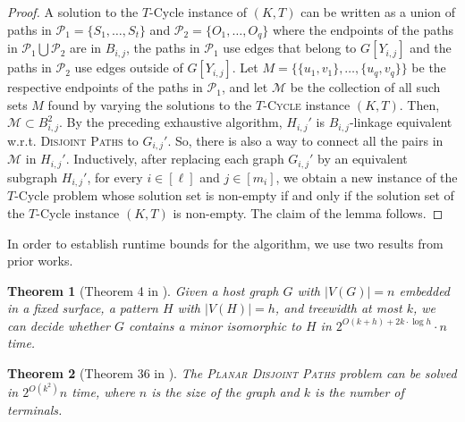 \documentclass{article}
\newtheorem{theorem}{Theorem}
\numberwithin{claimcounter}{lemma}
\newcommand{\tcycle}{$T$-\textsc{Cycle}\xspace}
\newcommand{\dispaths}{\textsc{Disjoint Paths}\xspace}
\begin{document}
\begin{proof}
    A solution to the {\sc $T$-Cycle} instance of $(K,T)$  can be written as a union  of paths in $\mathcal{P}_1 = \{S_1, \dots, S_t\}$ and $\mathcal{P}_2 = \{O_1, \dots, O_q\}$ where the endpoints of the paths in  $\mathcal{P}_1 \bigcup \mathcal{P}_2$ are in $B_{i,j}$,  the paths in $\mathcal{P}_1$ use edges that belong to $G[Y_{i,j}]$ and the paths in $\mathcal{P}_2$ use edges outside of $G[Y_{i,j}]$. Let $M = \{ \{u_1,v_1\},\dots,\{u_q,v_q\} \}$ be the respective endpoints of the paths in $\mathcal{P}_1$, and let $\mathcal{M}$ be the collection of all such sets $M$ found by varying the solutions to the \tcycle instance $(K,T)$. Then, $\mathcal{M} \subset B_{i,j}^2$. By the preceding exhaustive algorithm, $H_{i,j}'$ is $B_{i,j}$-linkage equivalent w.r.t. \dispaths to $G_{i,j}'$. So, there is also a way to connect all the pairs in $\mathcal{M}$ in $H_{i,j}'$.
Inductively, after replacing each graph $G_{i,j}'$ by an equivalent subgraph $H_{i,j}'$, for every $i\in [\ell]$ and $j \in [m_i]$, we obtain a new instance of the  {\sc $T$-Cycle} problem whose solution set is non-empty if and only if the solution set of the {\sc $T$-Cycle} instance $(K,T)$ is non-empty. The claim of the lemma follows.
\end{proof}

In order to establish runtime bounds for the algorithm, we  use two  results from prior works.

\begin{theorem}[Theorem 4 in \cite{adlertwo}] \label{thm:adlerres}
    Given a host graph $G$ with $|V(G)|=n$ embedded in a fixed surface,
a pattern $H$ with $|V(H)|=h$, and treewidth at most $k$, we can
decide whether $G$ contains a minor isomorphic to $H$ in $2^{O(k+h)+2k \cdot \log h} \cdot n$ time.
\end{theorem}

\begin{theorem}[Theorem 36 in \cite{cho2023parameterized}] \label{thm:chores}
    The \textsc{Planar Disjoint Paths} problem can be solved in $2^{O(k^{2})}n$
time, where $n$ is the size of the graph and $k$ is the number of
terminals. 
\end{theorem}
\end{document}

